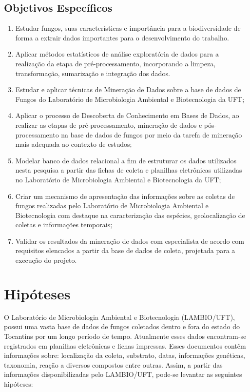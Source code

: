 \documentclass[tcc2]{classe_uftex/uftex}
\begin{document}
    \subsection{Objetivos Específicos}
    \label{sec:objetivos_especificos}
        \begin{enumerate}
            \item Estudar fungos, suas características e importância para a biodiversidade de forma a extrair dados importantes para o desenvolvimento do trabalho.
            \item Aplicar métodos estatísticos de análise exploratória de dados para a realização da etapa de pré-processamento, incorporando a limpeza, transformação, sumarização e integração dos dados.
            \item Estudar e aplicar técnicas de Mineração de Dados sobre a base de dados de Fungos do Laboratório de Microbiologia Ambiental e Biotecnologia da UFT;
        	\item Aplicar o processo de Descoberta de Conhecimento em Bases de Dados, ao realizar as etapas de pré-processamento, mineração de dados e pós-processamento na base de dados de fungos por meio da tarefa de mineração mais adequada ao contexto de estudos;
        	\item Modelar banco de dados relacional a fim de estruturar os dados utilizados nesta pesquisa a partir das fichas de coleta e planilhas eletrônicas utilizadas no Laboratório de Microbiologia Ambiental e Biotecnologia da UFT;
        	\item Criar um mecanismo de apresentação das informações sobre as coletas de fungos realizadas pelo Laboratório de Microbiologia Ambiental e Biotecnologia com destaque na caracterização das espécies, geolocalização de coletas e informações temporais;
        	\item Validar os resultados da mineração de dados com especialista de acordo com requisitos elencados a partir da base de dados de coleta, projetada para a execução do projeto.
        \end{enumerate}

\section{Hipóteses}
\label{sec:hipotese}
O Laboratório de Microbiologia Ambiental e Biotecnologia (LAMBIO/UFT), possui uma vasta base de dados de fungos coletados dentro e fora do estado do Tocantins por um longo período de tempo. Atualmente esses dados encontram-se registrados em planilhas eletrônicas e fichas impressas. Esses documentos contêm informações sobre: localização da coleta, substrato, datas, informações genéticas, taxonomia, reação a diversos compostos entre outras. Assim, a partir das informações disponibilizadas pelo LAMBIO/UFT, pode-se levantar as seguintes hipóteses:
\end{document}
